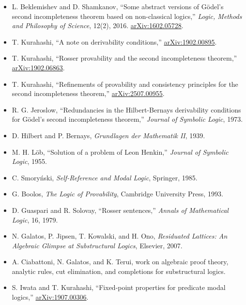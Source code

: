 ﻿\documentclass[a4paper,10pt]{ltjsarticle}
\begin{document}
\begin{itemize}
\item L. Beklemishev and D. Shamkanov,
``Some abstract versions of Gödel's second incompleteness theorem based on non-classical logics,''
\emph{Logic, Methods and Philosophy of Science}, 12(2), 2016.
\href{https://arxiv.org/abs/1602.05728}{arXiv:1602.05728}.
\item T. Kurahashi,
``A note on derivability conditions,''
\href{https://arxiv.org/abs/1902.00895}{arXiv:1902.00895}.
\item T. Kurahashi,
``Rosser provability and the second incompleteness theorem,''
\href{https://arxiv.org/abs/1902.06863}{arXiv:1902.06863}.
\item T. Kurahashi,
``Refinements of provability and consistency principles for the second incompleteness theorem,''
\href{https://arxiv.org/abs/2507.00955}{arXiv:2507.00955}.
\item R. G. Jeroslow,
``Redundancies in the Hilbert-Bernays derivability conditions for Gödel's second incompleteness theorem,''
\emph{Journal of Symbolic Logic}, 1973.
\item D. Hilbert and P. Bernays, \emph{Grundlagen der Mathematik II}, 1939.
\item M. H. Löb,
``Solution of a problem of Leon Henkin,''
\emph{Journal of Symbolic Logic}, 1955.
\item C. Smoryński, \emph{Self-Reference and Modal Logic}, Springer, 1985.
\item G. Boolos, \emph{The Logic of Provability}, Cambridge University Press, 1993.
\item D. Guaspari and R. Solovay,
``Rosser sentences,''
\emph{Annals of Mathematical Logic}, 16, 1979.
\item N. Galatos, P. Jipsen, T. Kowalski, and H. Ono,
\emph{Residuated Lattices: An Algebraic Glimpse at Substructural Logics},
Elsevier, 2007.
\item A. Ciabattoni, N. Galatos, and K. Terui,
work on algebraic proof theory, analytic rules, cut elimination, and completions for substructural logics.
\item S. Iwata and T. Kurahashi,
``Fixed-point properties for predicate modal logics,''
\href{https://arxiv.org/abs/1907.00306}{arXiv:1907.00306}.
\end{itemize}
\end{document}
